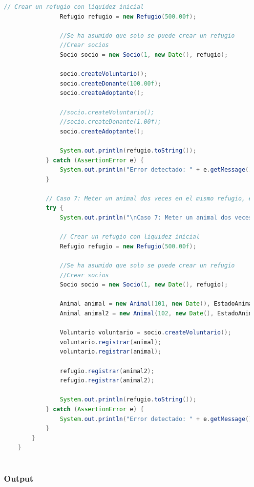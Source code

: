 \begin{lstlisting}[style = javaNormal, language=Java]
                // Crear un refugio con liquidez inicial
                Refugio refugio = new Refugio(500.00f);
    
                //Se ha asumido que solo se puede crear un refugio
                //Crear socios
                Socio socio = new Socio(1, new Date(), refugio);
    
                socio.createVoluntario();
                socio.createDonante(100.00f);
                socio.createAdoptante();
    
                //socio.createVoluntario();
                //socio.createDonante(1.00f);
                socio.createAdoptante();
    
                System.out.println(refugio.toString());
            } catch (AssertionError e) {
                System.out.println("Error detectado: " + e.getMessage());
            }
    
            // Caso 7: Meter un animal dos veces en el mismo refugio, el mismo animal y luego dos distintos, desde refugio y desde voluntario
            try {
                System.out.println("\nCaso 7: Meter un animal dos veces en el mismo refugio, el mismo animal y luego dos distintos, desde refugio y desde voluntario\n");
    
                // Crear un refugio con liquidez inicial
                Refugio refugio = new Refugio(500.00f);
    
                //Se ha asumido que solo se puede crear un refugio
                //Crear socios
                Socio socio = new Socio(1, new Date(), refugio);
    
                Animal animal = new Animal(101, new Date(), EstadoAnimal.ENTRATAMIENTO);
                Animal animal2 = new Animal(102, new Date(), EstadoAnimal.ENTRATAMIENTO);
    
                Voluntario voluntario = socio.createVoluntario();
                voluntario.registrar(animal);
                voluntario.registrar(animal);
    
                refugio.registrar(animal2);
                refugio.registrar(animal2);
    
                System.out.println(refugio.toString());
            } catch (AssertionError e) {
                System.out.println("Error detectado: " + e.getMessage());
            }
        }
    }
    
\end{lstlisting}

\subsubsection{Output}


